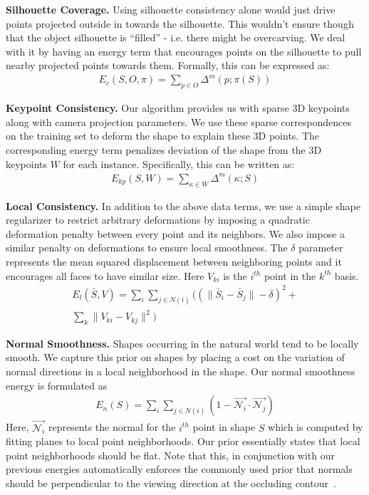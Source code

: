 \vspace{3mm}
\noindent \textbf{Silhouette Coverage.}
Using silhouette consistency alone would just drive points projected outside in towards the silhouette. This wouldn't ensure though that the object silhouette is ``filled'' - i.e. there might be overcarving. We deal with it by having an energy term that encourages points on the silhouette to pull nearby projected points towards them. Formally, this can be expressed as:
\begin{gather}
    \label{eq:sil_cov}E_{c}(S,O,\pi)=\underset{p\in O}{\sum}\Delta^m(p;\pi(S))
\end{gather}

\vspace{3mm}
\noindent \textbf{Keypoint Consistency.} Our \nrsfm algorithm provides us with sparse 3D keypoints along with camera projection parameters. We use these sparse correspondences on the training set to deform the shape to explain these 3D points. The corresponding energy term penalizes deviation of the shape from the 3D keypoints $W$ for each instance. Specifically, this can be written as:
\begin{gather}
    \label{eq:kpgrad}E_{kp}(S,W)=\underset{\kappa\in W}{\sum}\Delta^m(\kappa;S)
\end{gather}

\vspace{3mm}
\noindent \textbf{Local Consistency.} In addition to the above data terms, we use a simple shape regularizer to restrict arbitrary deformations by imposing a quadratic deformation penalty between every point and its neighbors. We also impose a similar penalty on deformations to ensure local smoothness. The $\delta$ parameter represents the mean squared displacement between neighboring points and it encourages all faces to have similar size. Here $V_{ki}$ is the $i^{th}$ point in the $k^{th}$ basis.
\begin{multline}
 \label{eq:local_con}E_{l}(\bar{S},V)=\underset{i}{\sum}\underset{j\in N(i)}{\sum}((\|\bar{S}_{i}-\bar{S}_{j}\| - \delta)^2 +\\
 \underset{k}{\sum}\|V_{ki}-V_{kj}\|^2)
 \end{multline}
 
\vspace{3mm}
\noindent \textbf{Normal Smoothness.} Shapes occurring in the natural world tend to be locally smooth. We capture this prior on shapes by placing a cost on the variation of normal directions in a local neighborhood in the shape. Our normal smoothness energy is formulated as
\begin{gather}
 \label{eq:normal_con}E_{n}(S)=\underset{i}{\sum}\underset{j\in N(i)}{\sum}(1-\vec{\mathcal{N}_i} \cdot \vec{\mathcal{N}_j})
\end{gather}
 Here, $\vec{\mathcal{N}_i}$ represents the normal for the $i^{th}$ point in shape $S$ which is computed by fitting planes to local point neighborhoods. Our prior essentially states that local point neighborhoods should be flat. Note that this, in conjunction with our previous energies automatically enforces the commonly used prior that normals should be perpendicular to the viewing direction at the occluding contour~\cite{Barron2012B}.

